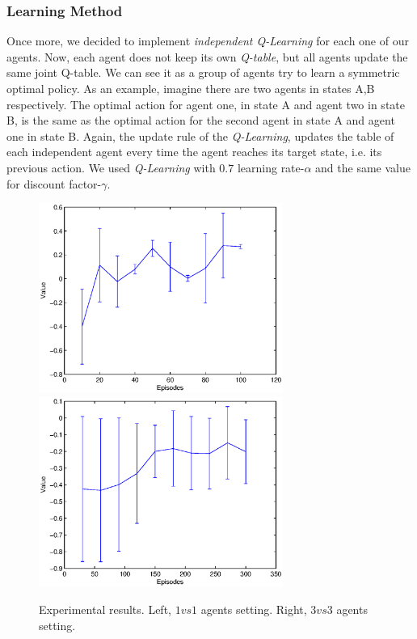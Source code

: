 \documentclass[conference]{IEEEtran}
\begin{document}
\subsubsection{Learning Method}
Once more, we decided to implement \textit{independent Q-Learning} for each one of our agents. Now, each agent does not keep its own \textit{Q-table}, but all agents update the same joint Q-table. We can see it as a group of agents try to learn a symmetric optimal policy. As an example, imagine there are two agents in states A,B respectively. The optimal action for agent one, in state A and agent two in state B, is the same as the optimal action for the second agent in state A and agent one in state B. Again, the update rule of the \textit{Q-Learning}, updates the table of each independent agent every time the agent reaches its target state, i.e. its previous action. We used \textit{Q-Learning} with $0.7$ learning rate-$\alpha$ and the same value for discount factor-$\gamma$.
\begin{figure}[t]
\centering  
    \includegraphics[width=8cm]{figures/snake1vs1.eps}\	
    \includegraphics[width=8cm]{figures/snake3vs3.eps}
   \caption{Experimental results. Left, $1vs1$ agents setting. Right, $3vs3$ agents setting.}
   \label{snake}
\end{figure}
\end{document}
